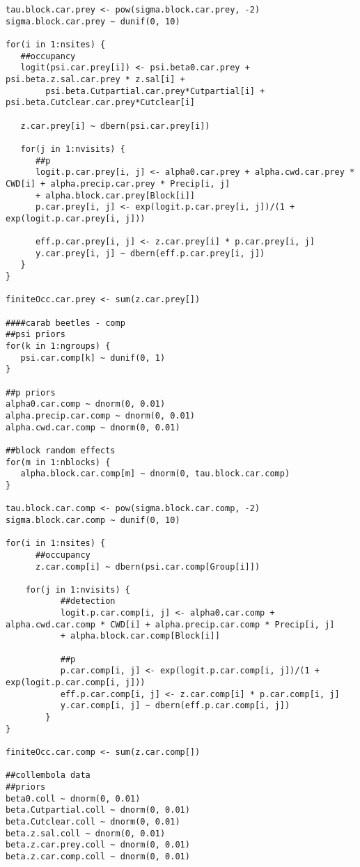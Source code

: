 \begin{lstlisting}
tau.block.car.prey <- pow(sigma.block.car.prey, -2)
sigma.block.car.prey ~ dunif(0, 10)

for(i in 1:nsites) {
   ##occupancy
   logit(psi.car.prey[i]) <- psi.beta0.car.prey + psi.beta.z.sal.car.prey * z.sal[i] +
    	psi.beta.Cutpartial.car.prey*Cutpartial[i] + psi.beta.Cutclear.car.prey*Cutclear[i]
    	
   z.car.prey[i] ~ dbern(psi.car.prey[i])

   for(j in 1:nvisits) {
      ##p
      logit.p.car.prey[i, j] <- alpha0.car.prey + alpha.cwd.car.prey * CWD[i] + alpha.precip.car.prey * Precip[i, j]
      + alpha.block.car.prey[Block[i]]
      p.car.prey[i, j] <- exp(logit.p.car.prey[i, j])/(1 + exp(logit.p.car.prey[i, j]))

      eff.p.car.prey[i, j] <- z.car.prey[i] * p.car.prey[i, j]
      y.car.prey[i, j] ~ dbern(eff.p.car.prey[i, j])
   }
}

finiteOcc.car.prey <- sum(z.car.prey[])

####carab beetles - comp
##psi priors
for(k in 1:ngroups) {
   psi.car.comp[k] ~ dunif(0, 1)
}

##p priors
alpha0.car.comp ~ dnorm(0, 0.01)
alpha.precip.car.comp ~ dnorm(0, 0.01)
alpha.cwd.car.comp ~ dnorm(0, 0.01)

##block random effects
for(m in 1:nblocks) {
   alpha.block.car.comp[m] ~ dnorm(0, tau.block.car.comp)
}

tau.block.car.comp <- pow(sigma.block.car.comp, -2)
sigma.block.car.comp ~ dunif(0, 10)

for(i in 1:nsites) {
      ##occupancy
      z.car.comp[i] ~ dbern(psi.car.comp[Group[i]])

   	for(j in 1:nvisits) {
      	   ##detection
      	   logit.p.car.comp[i, j] <- alpha0.car.comp + alpha.cwd.car.comp * CWD[i] + alpha.precip.car.comp * Precip[i, j]
           + alpha.block.car.comp[Block[i]]

      	   ##p
      	   p.car.comp[i, j] <- exp(logit.p.car.comp[i, j])/(1 + exp(logit.p.car.comp[i, j]))
      	   eff.p.car.comp[i, j] <- z.car.comp[i] * p.car.comp[i, j]
      	   y.car.comp[i, j] ~ dbern(eff.p.car.comp[i, j])
      	}
}

finiteOcc.car.comp <- sum(z.car.comp[])

##collembola data
##priors
beta0.coll ~ dnorm(0, 0.01)
beta.Cutpartial.coll ~ dnorm(0, 0.01)
beta.Cutclear.coll ~ dnorm(0, 0.01)
beta.z.sal.coll ~ dnorm(0, 0.01)
beta.z.car.prey.coll ~ dnorm(0, 0.01)
beta.z.car.comp.coll ~ dnorm(0, 0.01)


\end{lstlisting}
